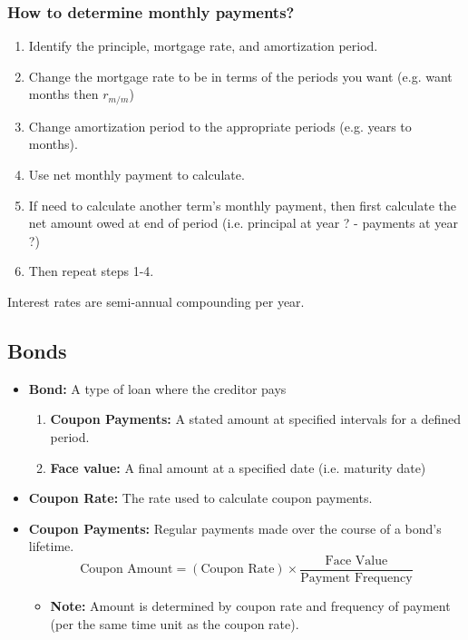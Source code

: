 \subsubsection{How to determine monthly payments?}
\begin{process}
    \begin{enumerate}
        \item Identify the principle, mortgage rate, and amortization period.
        \item Change the mortgage rate to be in terms of the periods you want (e.g. want months then $r_{m/m}$)
        \item Change amortization period to the appropriate periods (e.g. years to months).
        \item Use net monthly payment to calculate.
        \item If need to calculate another term's monthly payment, then first calculate the net amount owed at end of period (i.e. principal at year ? - payments at year ?)
        \item Then repeat steps 1-4.
    \end{enumerate}
\end{process}

\begin{warning}
    Interest rates are semi-annual compounding per year.
\end{warning}

\subsection{Bonds}
\begin{terminology}
    \begin{itemize}
        \item \textbf{Bond:} A type of loan where the creditor pays
        \begin{enumerate}
            \item \textbf{Coupon Payments:} A stated amount at specified intervals for a defined period.
            \item \textbf{Face value:} A final amount at a specified date (i.e. maturity date)
        \end{enumerate}
        \item \textbf{Coupon Rate:} The rate used to calculate coupon payments.
        \item \textbf{Coupon Payments:} Regular payments made over the course of a bond’s lifetime. 
        \begin{equation}
            \text{Coupon Amount} = (\text{Coupon Rate}) \times \frac{\text{Face Value}}{\text{Payment Frequency}}
        \end{equation}
        \begin{itemize}
            \item \textbf{Note:} Amount is determined by coupon rate and frequency of payment (per the same time unit as the coupon rate).
        \end{itemize}
    \end{itemize}
\end{terminology}

